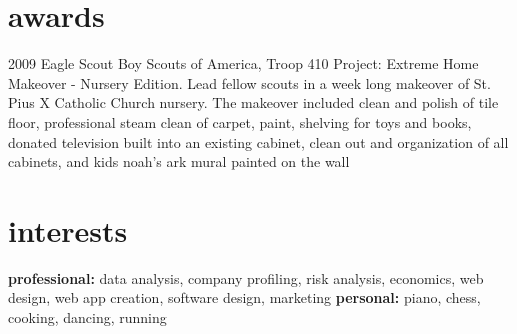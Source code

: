 \documentclass[]{friggeri-cv} %
\begin{document}
\section{awards}

\begin{entrylist}
\entry
{2009}
{Eagle Scout}
{Boy Scouts of America, Troop 410}
{Project: Extreme Home Makeover - Nursery Edition.  Lead fellow scouts in a week long makeover of St. Pius X Catholic Church nursery.  The makeover included clean and polish of tile floor, professional steam clean of carpet, paint, shelving for toys and books, donated television built into an existing cabinet, clean out and organization of all cabinets, and kids noah's ark mural painted on the wall}
\end{entrylist}


\section{interests}

\textbf{professional:} data analysis, company profiling, risk analysis, economics, web design, web app creation, software design, marketing \textbf{personal:} piano, chess, cooking, dancing, running
\end{document}
